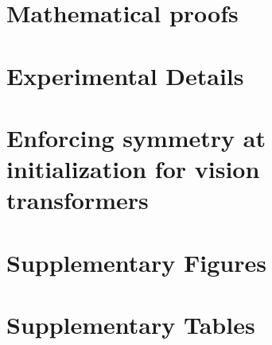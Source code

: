 \documentclass[11pt,twocolumn]{article}
\theoremstyle{plain}
\theoremstyle{definition}
\theoremstyle{remark}
\begin{document}
\makeatother
\onecolumn


\section{Mathematical proofs}
\label{sec-proof-statements}


\section{Experimental Details}
\label{sec-experimental-details}


\section{Enforcing symmetry at initialization for vision transformers}
\label{sec-experimental-results-vit}


\section{Supplementary Figures}
\label{sec-supp-figures}


\section{Supplementary Tables}
\label{sec-supp-tables}

\end{document}
